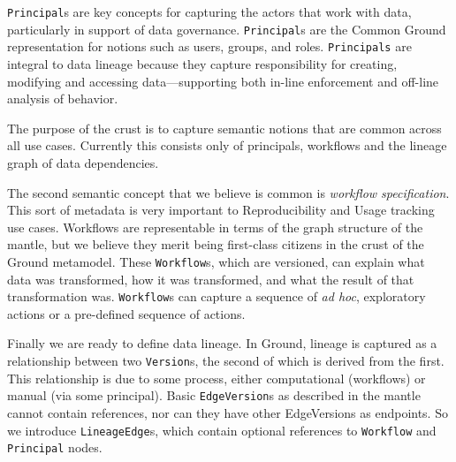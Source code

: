 \documentclass{article}
\newenvironment{tldr}[1][r]
  {\wrapfigure{#1}{0.33\textwidth}\tcolorbox}
  {\endtcolorbox\endwrapfigure}
\newcommand{\mantle}{mantle\xspace}
\newcommand{\crust}{crust\xspace}
\newcommand{\version}{\texttt{Version}\xspace}
\newcommand{\node}{\texttt{Node}\xspace}
\newcommand{\edge}{\texttt{Edge}\xspace}
\newcommand{\structure}{\texttt{Structure}\xspace}
\newcommand{\lineagegraph}{lineage graph\xspace}
\begin{document}
\texttt{Principal}s are key concepts for capturing the actors that work with data, particularly in support of data governance. \texttt{Principal}s are
the Common Ground representation for notions such as users, groups, and roles.
\texttt{Principals} are integral to data lineage because
they capture responsibility for creating, modifying and accessing data---supporting
both in-line enforcement and off-line analysis of behavior.

\begin{tldr}
The purpose of the \crust is to capture semantic notions that are common across all use cases.  Currently this consists only of principals, workflows and the \lineagegraph of data dependencies.
\end{tldr}

The second semantic concept that we believe is common is \emph{workflow specification}.
This sort of metadata is very important to Reproducibility and Usage tracking use cases.
Workflows are representable in terms of the graph
structure of the \mantle, but we believe they merit being
first-class citizens in the \crust of the Ground metamodel. These
\texttt{Workflow}s,
which are versioned, can explain what data was transformed, how it was
transformed, and what the result of that transformation was. \texttt{Workflow}s
can capture a sequence of \textit{ad hoc}, exploratory actions or a
pre-defined sequence of actions.

Finally we are ready to define data lineage.  In Ground, lineage
is captured as a relationship between two {\version}s, the second of which is derived from the
first. This relationship is due to some process, either computational
(workflows) or manual (via some principal). Basic \texttt{EdgeVersion}s as described
in the \mantle cannot contain references, nor can they have other {EdgeVersion}s as endpoints.  
So we introduce \texttt{LineageEdge}s, which contain 
optional references to \texttt{Workflow} and \texttt{Principal} nodes.
\end{document}
